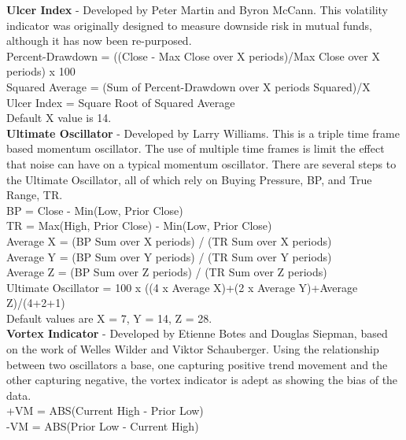 \documentclass[12pt,a4paper]{article}
\begin{document}
\iffalse
[]
\fi

\textbf{Ulcer Index} - Developed by Peter Martin and Byron McCann. This volatility indicator was originally designed to measure downside risk in mutual funds, although it has now been re-purposed.  \\

Percent-Drawdown = ((Close - Max Close over X periods)/Max Close over X periods) x 100\\
Squared Average = (Sum of Percent-Drawdown over X periods Squared)/X\\
Ulcer Index = Square Root of Squared Average\\
Default X value is 14.\\

\iffalse
[]
\fi

\textbf{Ultimate Oscillator} - Developed by Larry Williams. This is a triple time frame based momentum oscillator. The use of multiple time frames is limit the effect that noise can have on a typical momentum oscillator. There are several steps to the Ultimate Oscillator, all of which rely on Buying Pressure, BP, and True Range, TR.\\

BP = Close - Min(Low, Prior Close)\\
TR = Max(High, Prior Close)  -  Min(Low, Prior Close)\\

Average X = (BP Sum over X periods) / (TR Sum over X periods)\\
Average Y = (BP Sum over Y periods) / (TR Sum over Y periods)\\
Average Z = (BP Sum over Z periods) / (TR Sum over Z periods)\\

Ultimate Oscillator = 100 x ((4 x Average X)+(2 x Average Y)+Average Z)/(4+2+1)\\
Default values are X = 7, Y = 14, Z = 28.\\

\iffalse
[]
\fi

\textbf{Vortex Indicator} - Developed by Etienne Botes and Douglas Siepman, based on the work of Welles Wilder and Viktor Schauberger. Using the relationship between two oscillators a base, one capturing positive trend movement and the other capturing negative, the vortex indicator is adept as showing the bias of the data.\\

+VM = ABS(Current High - Prior Low)\\
-VM = ABS(Prior Low - Current High)\\
\end{document}

